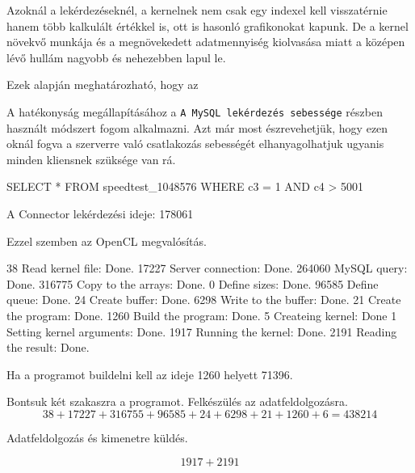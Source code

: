 Azoknál a lekérdezéseknél, a kernelnek nem csak egy indexel kell visszatérnie hanem több kalkulált értékkel is, ott is hasonló grafikonokat kapunk. De a kernel növekvő munkája és a megnövekedett adatmennyiség kiolvasása miatt a középen lévő hullám nagyobb és nehezebben lapul le.

Ezek alapján meghatározható, hogy az 
\newpage
{}

A hatékonyság megállapításához a \texttt{A MySQL lekérdezés sebessége} részben használt módszert fogom alkalmazni.
Azt már most észrevehetjük, hogy ezen oknál fogva a szerverre való csatlakozás sebességét elhanyagolhatjuk ugyanis minden kliensnek szüksége van rá. 


\begin{python}
SELECT * FROM speedtest_1048576 WHERE c3 = 1 AND c4 > 5001
\end{python}

A Connector lekérdezési ideje: 178061 


Ezzel szemben az OpenCL megvalósítás.
\begin{python}
38      Read kernel file: Done.
17227   Server connection: Done.
264060  MySQL query: Done.
316775  Copy to the arrays: Done.
0       Define sizes: Done.
96585   Define queue: Done.
24      Create buffer: Done.
6298    Write to the buffer: Done.
21      Create the program: Done.
1260    Build the program: Done.
5       Createing kernel: Done
1       Setting kernel arguments: Done.
1917    Running the kernel: Done.
2191    Reading the result: Done.
\end{python}

Ha a programot buildelni kell az ideje 1260 helyett 71396.

Bontsuk két szakaszra a programot.
Felkészülés az adatfeldolgozásra. 
$$ 38 + 17227 + 316755 + 96585 + 24 + 6298 + 21 + 1260 + 6 = 438214 $$

Adatfeldolgozás és kimenetre küldés.

$$ 1917 + 2191 $$